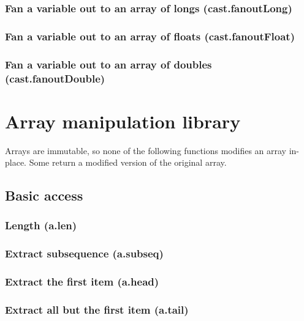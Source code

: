 \documentclass{article}
\theoremstyle{definition}
\begin{document}
\subsubsection{Fan a variable out to an array of longs (cast.fanoutLong)}

\subsubsection{Fan a variable out to an array of floats (cast.fanoutFloat)}

\subsubsection{Fan a variable out to an array of doubles (cast.fanoutDouble)}

\pagebreak

\section{Array manipulation library}

Arrays are immutable, so none of the following functions modifies an array in-place.  Some return a modified version of the original array.

\subsection{Basic access}

\subsubsection{Length (a.len)}

\subsubsection{Extract subsequence (a.subseq)}

\subsubsection{Extract the first item (a.head)}

\subsubsection{Extract all but the first item (a.tail)}
\end{document}
